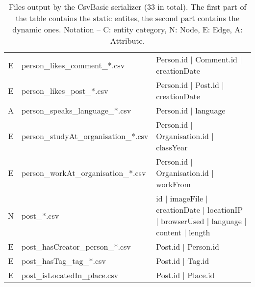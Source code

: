 \begin{table}[htb]
\begin{tabular}{|c|p{4.6cm}|p{9.8cm}|}
        E                       & person\_likes\_comment\_*.csv           & Person.id | Comment.id | creationDate                                                      \\
        E                       & person\_likes\_post\_*.csv              & Person.id | Post.id | creationDate                                                      \\
        A                       & person\_speaks\_language\_*.csv         & Person.id | language                                                                    \\
        E                       & person\_studyAt\_organisation\_*.csv    & Person.id | Organisation.id | classYear                                                 \\
        E                       & person\_workAt\_organisation\_*.csv     & Person.id | Organisation.id | workFrom                                                  \\
        \hline
        N                       & post\_*.csv                             & id | imageFile | creationDate | locationIP | browserUsed | language | content | length  \\
        E                       & post\_hasCreator\_person\_*.csv         & Post.id | Person.id                                                                     \\
        E                       & post\_hasTag\_tag\_*.csv                & Post.id | Tag.id                                                                        \\
        E                       & post\_isLocatedIn\_place.csv            & Post.id | Place.id                                                                      \\
        \hline
    \end{tabular}
    \caption{Files output by the CsvBasic serializer (33 in total). The first part of the table contains the static entites, the second part contains the dynamic ones. Notation -- C: entity category, N: Node, E: Edge, A: Attribute.}
    \label{table:csv_basic}
\end{table}
